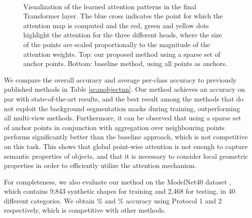 \documentclass[a4paper,conference]{IEEEtran}
\begin{document}
\begin{figure*}
\centering
{}
\hfill \\
\centering
{}
\hfill
\caption{Visualization of the learned attention patterns in the final Transformer layer. The blue cross indicates the point for which the attention map is computed and the red, green and yellow dots highlight the attention for the three different heads, where the size of the points are scaled proportionally to the magnitude of the attention weights. Top: our proposed method using a sparse set of anchor points. Bottom: baseline method, using all points as anchors.}
\label{attention_fig}
\end{figure*}

We compare the overall accuracy and average per-class accuracy to previously published methods in Table \ref{scanobjectnn}. Our method achieves an accuracy on par with state-of-the-art results, and the best result among the methods that do not exploit the background segmentation masks during training, outperforming all multi-view methods. Furthermore, it can be observed that using a sparse set of anchor points in conjunction with aggregation over neighbouring points performs significantly better than the baseline approach, which is not competitive on this task. This shows that global point-wise attention is not enough to capture semantic properties of objects, and that it is necessary to consider local geometric properties in order to efficiently utilize the attention mechanism.

For completeness, we also evaluate our method on the ModelNet40 dataset \cite{wu20153d}, which contains 9,843 synthetic shapes for training and 2,468 for testing, in 40 different categories. We obtain  \% and  \% accuracy using Protocol 1 and 2 respectively, which is competitive with other methods. 
\end{document}

